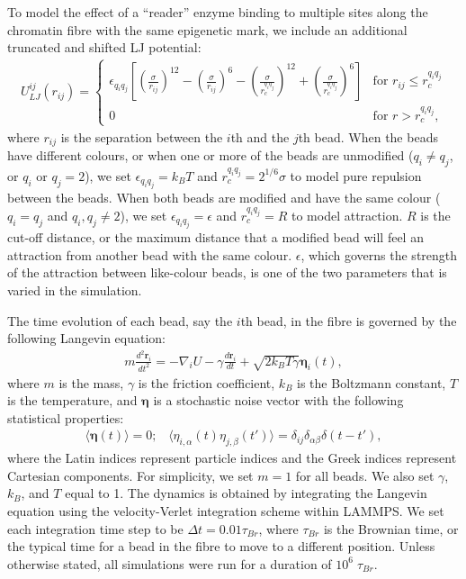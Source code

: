 \documentclass[12pt]{article}
\begin{document}
To model the effect of a ``reader'' enzyme binding to multiple sites along the chromatin fibre with the same epigenetic mark, we include an additional truncated and shifted LJ potential:
\begin{eqnarray}
U_{LJ}^{ij}(r_{ij}) = \left\{ 
	\begin{array}{ll}
	\epsilon_{q_iq_j} \left[ \left(\frac{\sigma}{r_{ij}}\right)^{12}-\left(\frac{\sigma}{r_{ij}}\right)^{6}-\left(\frac{\sigma}{r_c^{q_iq_j}}\right)^{12}+\left(\frac{\sigma}{r_c^{q_iq_j}}\right)^{6}\right] & \textrm{for $r_{ij} \le r_c^{q_iq_j}$}\\
	0 & \textrm{for $r > r_c^{q_iq_j}$},
	\end{array}
\right.
\end{eqnarray}
where $r_{ij}$ is the separation between the $i$th and the $j$th bead. When the beads have different colours, or when one or more of the beads are unmodified ($q_i \neq q_j$, or $q_i$ or $q_j = 2$), we set $\epsilon_{q_iq_j} = k_BT$ and $r_c^{q_iq_j} = 2^{1/6}\sigma$ to model pure repulsion between the beads. When both beads are modified and have the same colour ($q_i = q_j$ and $q_i, q_j \neq 2$), we set $\epsilon_{q_iq_j}= \epsilon$ and $r_c^{q_iq_j} = R$ to model attraction. $R$ is the cut-off distance, or the maximum distance that a modified bead will feel an attraction from another bead with the same colour. $\epsilon$, which governs the strength of the attraction between like-colour beads, is one of the two parameters that is varied in the simulation. 

The time evolution of each bead, say the $i$th bead, in the fibre is governed by the following Langevin equation:
\begin{eqnarray}
m\frac{d^2\bm{r}_i}{dt^2} = - \nabla_i U - \gamma \frac{d\bm{r}_i}{dt} + \sqrt{2k_BT\gamma}\bm{\eta}_i(t),
\end{eqnarray}
where $m$ is the mass, $\gamma$ is the friction coefficient, $k_B$ is the Boltzmann constant, $T$ is the temperature, and $\bm{\eta}$ is a stochastic noise vector with the following statistical properties:
\begin{eqnarray}
\langle\bm{\eta}(t)\rangle = 0;\;\;\; \langle\eta_{i,\alpha}(t)\eta_{j,\beta}(t')\rangle = \delta_{ij}\delta_{\alpha\beta}\delta(t-t'),
\end{eqnarray}
where the Latin indices represent particle indices and the Greek indices represent Cartesian components. For simplicity, we set $m = 1$ for all beads. We also set $\gamma$, $k_B$, and $T$ equal to 1. The dynamics is obtained by integrating the Langevin equation using the velocity-Verlet integration scheme within LAMMPS. We set each integration time step to be $\Delta t = 0.01\tau_{Br}$, where $\tau_{Br}$ is the Brownian time, or the typical time for a bead in the fibre to move to a different position. Unless otherwise stated, all simulations were run for a duration of $10^6\;\tau_{Br}$.
\end{document}
